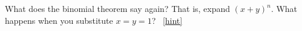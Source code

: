 \documentclass{book}
\begin{document}
\setcounter{project}{79}
\addtocounter{project}{-1}
\begin{activity}[]\label{act-pascalrowsum-binom}
\hypertarget{p-626}{}%
What does the binomial theorem say again?  That is, expand \((x+y)^n\).  What happens when you substitute \(x = y = 1\)?%
~\hfill{\tiny\hyperlink{a-79}{[hint]}\hypertarget{q-79}{}}\end{activity}
\end{document}

